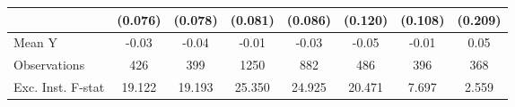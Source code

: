 {\begin{tabular}{l*{7}{c}}
            &     (0.076)         &     (0.078)         &     (0.081)         &     (0.086)         &     (0.120)         &     (0.108)         &     (0.209)         \\
\midrule
Mean Y      &       -0.03         &       -0.04         &       -0.01         &       -0.03         &       -0.05         &       -0.01         &        0.05         \\
Observations&         426         &         399         &        1250         &         882         &         486         &         396         &         368         \\
Exc. Inst. F-stat&      19.122         &      19.193         &      25.350         &      24.925         &      20.471         &       7.697         &       2.559         \\
\bottomrule
\end{tabular}
}
